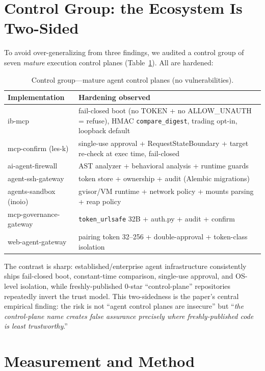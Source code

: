 \documentclass{llncs}
\begin{document}
\section{Control Group: the Ecosystem Is Two-Sided}\label{sec:control}

To avoid over-generalizing from three findings, we audited a control group of seven \emph{mature} execution control planes (Table~\ref{tab:control}). All are hardened:

\begin{table}[ht]
\centering\small
\caption{Control group---mature agent control planes (no vulnerabilities).}
\label{tab:control}
\begin{tabular}{@{}ll@{}}
\toprule
\textbf{Implementation} & \textbf{Hardening observed} \\
\midrule
ib-mcp & fail-closed boot (no TOKEN + no ALLOW\_UNAUTH = refuse), HMAC \texttt{compare\_digest}, trading opt-in, loopback default \\
mcp-confirm (les-k) & single-use approval + RequestStateBoundary + target re-check at exec time, fail-closed \\
ai-agent-firewall & AST analyzer + behavioral analysis + runtime guards \\
agent-ssh-gateway & token store + ownership + audit (Alembic migrations) \\
agents-sandbox (inoio) & gvisor/VM runtime + network policy + mounts parsing + reap policy \\
mcp-governance-gateway & \texttt{token\_urlsafe} 32B + auth.py + audit + confirm \\
web-agent-gateway & pairing token 32--256 + double-approval + token-class isolation \\
\bottomrule
\end{tabular}
\end{table}

\noindent The contrast is sharp: established/enterprise agent infrastructure consistently ships fail-closed boot, constant-time comparison, single-use approval, and OS-level isolation, while freshly-published 0-star ``control-plane'' repositories repeatedly invert the trust model. This two-sidedness is the paper's central empirical finding: the risk is not ``agent control planes are insecure'' but ``\emph{the control-plane name creates false assurance precisely where freshly-published code is least trustworthy}.''

\section{Measurement and Method}\label{sec:method}
\end{document}
